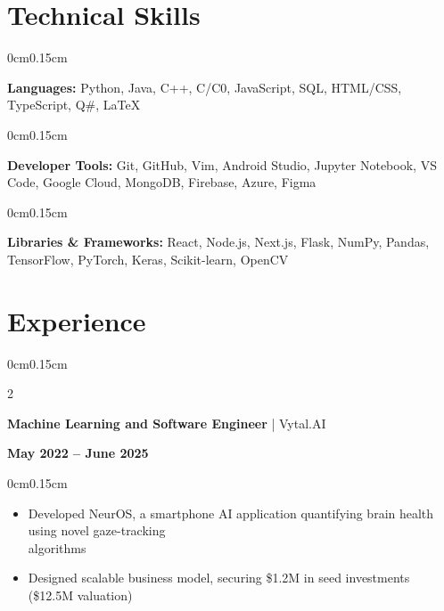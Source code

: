 \documentclass[10pt, letterpaper]{article}
\newenvironment{highlights}{
    \begin{itemize}[topsep=0pt, parsep=0pt, partopsep=0pt, itemsep=0pt, leftmargin=0.4cm]
}{
    \end{itemize}
}
\newenvironment{onecolentry}{
    \begin{adjustwidth}{0cm}{0.15cm}
}{
    \end{adjustwidth}
}
\newenvironment{twocolentry}[2][]{
    \onecolentry
    \def\secondColumn{#2}
    \setcolumnwidth{\fill, 4cm}
    \begin{paracol}{2}
}{
    \switchcolumn \raggedleft \secondColumn
    \end{paracol}
    \endonecolentry
}
\begin{document}
    \section{Technical Skills}
    \vspace{0.05cm}

    \begin{onecolentry}
        \textbf{Languages:} Python, Java, C++, C/C0, JavaScript, SQL, HTML/CSS, TypeScript, Q\#, LaTeX
    \end{onecolentry}

    \begin{onecolentry}
        \textbf{Developer Tools:} Git, GitHub, Vim, Android Studio, Jupyter Notebook, VS Code, Google Cloud, MongoDB, Firebase, Azure, Figma
    \end{onecolentry}

    \begin{onecolentry}
        \textbf{Libraries \& Frameworks:} React, Node.js, Next.js, Flask, NumPy, Pandas, TensorFlow, PyTorch, Keras, Scikit-learn, OpenCV
    \end{onecolentry}

    \vspace{0.05cm}

    \section{Experience}
    \vspace{0.05cm}

    \begin{twocolentry}{\textbf{May 2022 -- June 2025}}
        \textbf{Machine Learning and Software Engineer} | Vytal.AI
    \end{twocolentry}

    \vspace{0.05cm}
    \begin{onecolentry}
        \begin{highlights}
            \item Developed NeurOS, a smartphone AI application quantifying brain health using novel gaze-tracking\\algorithms
            \item Designed scalable business model, securing \$1.2M in seed investments (\$12.5M valuation)
        \end{highlights}
    \end{onecolentry}

    \vspace{0.1cm}
\end{document}
